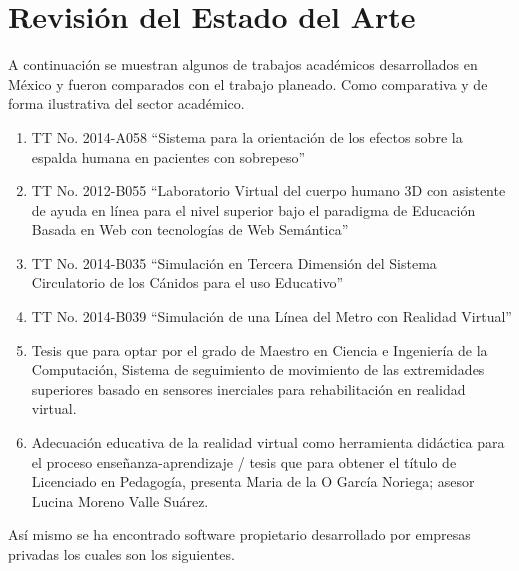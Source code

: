 \section{Revisión del Estado del Arte}
A continuación se muestran algunos de trabajos académicos desarrollados en México y fueron comparados con el trabajo planeado. Como comparativa y de forma ilustrativa 
del sector académico.\\
\newline
\begin{enumerate}
\item TT No. 2014-A058 “Sistema para la orientación de los efectos sobre la espalda humana en pacientes con sobrepeso”\cite{tt1}
\item TT No. 2012-B055 “Laboratorio Virtual del cuerpo humano 3D con asistente de ayuda en línea para el nivel superior bajo el paradigma de Educación Basada en Web con 
tecnologías de Web Semántica”\cite{tt2}
\item TT No. 2014-B035 “Simulación en Tercera Dimensión del Sistema Circulatorio de los Cánidos para el uso Educativo”\cite{tt3}
\item TT No. 2014-B039 “Simulación de una Línea del Metro con Realidad Virtual”\cite{tt4}
\item Tesis que para optar por el grado de Maestro en Ciencia e Ingeniería de la Computación, Sistema de seguimiento de movimiento de las extremidades superiores basado 
en sensores inerciales para rehabilitación en realidad virtual.\cite{mastersthesis1}
\item Adecuación educativa de la realidad virtual como herramienta didáctica para el proceso enseñanza-aprendizaje / tesis que para obtener el título de Licenciado en 
Pedagogía, presenta Maria de la O García Noriega; asesor Lucina Moreno Valle Suárez.\cite{te1}
\end{enumerate}
Así mismo se ha encontrado software propietario desarrollado por empresas privadas los cuales son los siguientes.\\
